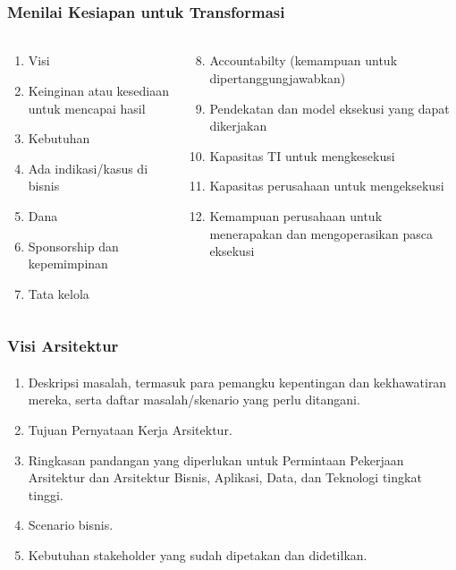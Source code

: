 \documentclass[aspectratio=169, table]{beamer}
\begin{document}
	\begin{frame}
		\frametitle{Menilai Kesiapan untuk Transformasi}
		
		\framesubtitle{\hspace{1cm}}
		\begin{columns}
			\begin{column}{0.5\textwidth}
				\begin{enumerate}
					\item Visi
					\item Keinginan atau kesediaan untuk mencapai hasil
					\item Kebutuhan
					\item Ada indikasi/kasus di bisnis
					\item Dana
					\item Sponsorship dan kepemimpinan
					\item Tata kelola
					
				\end{enumerate}
			\end{column}
			\begin{column}{0.5\textwidth}
				\begin{enumerate}
					\setcounter{enumi}{7}
					\item Accountabilty (kemampuan untuk dipertanggungjawabkan)
					\item Pendekatan dan model eksekusi yang dapat dikerjakan
					\item Kapasitas TI untuk mengkesekusi
					\item Kapasitas perusahaan untuk mengeksekusi
					\item Kemampuan perusahaan untuk menerapakan dan mengoperasikan pasca eksekusi
				\end{enumerate}
			\end{column}
		\end{columns}
	\end{frame}
	
	\begin{frame}
		\frametitle{Visi Arsitektur}
		\framesubtitle{\hspace{1cm}}
		\begin{enumerate}
			\item Deskripsi masalah, termasuk para pemangku kepentingan dan kekhawatiran mereka, serta daftar masalah/skenario yang perlu ditangani.
			\item Tujuan Pernyataan Kerja Arsitektur.
			\item Ringkasan pandangan yang diperlukan untuk Permintaan Pekerjaan Arsitektur dan Arsitektur Bisnis, Aplikasi, Data, dan Teknologi tingkat tinggi.
			\item Scenario bisnis.
			\item Kebutuhan stakeholder yang sudah dipetakan dan didetilkan.
		\end{enumerate}
	\end{frame}
	
\end{document}
